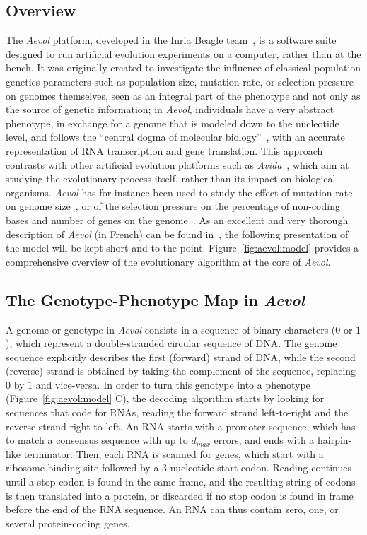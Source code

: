 \subsection{Overview}

The \emph{Aevol} platform, developed in the Inria Beagle team~\citep{rutten2019}, is a software suite designed to run artificial evolution experiments on a computer, rather than at the bench.
It was originally created to investigate the influence of classical population genetics parameters such as population size, mutation rate, or selection pressure on genomes themselves, seen as an integral part of the phenotype and not only as the source of genetic information; in \emph{Aevol}, individuals have a very abstract phenotype, in exchange for a genome that is modeled down to the nucleotide level, and follows the ``central dogma of molecular biology''~\citep{crick1958}, with an accurate representation of RNA transcription and gene translation.
This approach contrasts with other artificial evolution platforms such as \emph{Avida}~\citep{adami1994,ofria2004}, which aim at studying the evolutionary process itself, rather than its impact on biological organisms.
\emph{Aevol} has for instance been used to study the effect of mutation rate on genome size~\citep{knibbe2005}, or of the selection pressure on the percentage of non-coding bases and number of genes on the genome~\citep{batut2013}.
As an excellent and very thorough description of \emph{Aevol} (in French) can be found in~\cite{liard2020b}, the following presentation of the model will be kept short and to the point.
Figure~\ref{fig:aevol:model} provides a comprehensive overview of the evolutionary algorithm at the core of \emph{Aevol}.

\subsection{The Genotype-Phenotype Map in \emph{Aevol}}

A genome or genotype in \emph{Aevol} consists in a sequence of binary characters ($0$ or $1$), which represent a double-stranded circular sequence of DNA.
The genome sequence explicitly describes the first (forward) strand of DNA, while the second (reverse) strand is obtained by taking the complement of the sequence, replacing $0$ by $1$ and vice-versa.
In order to turn this genotype into a phenotype (Figure~\ref{fig:aevol:model} C), the decoding algorithm starts by looking for sequences that code for RNAs, reading the forward strand left-to-right and the reverse strand right-to-left.
An RNA starts with a promoter sequence, which has to match a consensus sequence with up to $d_{max}$ errors, and ends with a hairpin-like terminator.
Then, each RNA is scanned for genes, which start with a ribosome binding site followed by a 3-nucleotide start codon.
Reading continues until a stop codon is found in the same frame, and the resulting string of codons is then translated into a protein, or discarded if no stop codon is found in frame before the end of the RNA sequence.
An RNA can thus contain zero, one, or several protein-coding genes.

